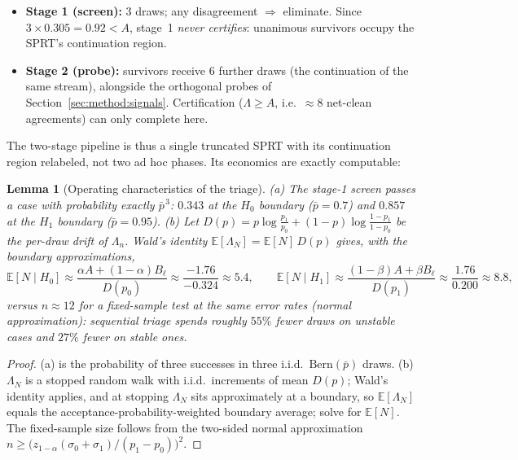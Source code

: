 \documentclass[11pt]{article}
\newtheorem{lemma}{Lemma}
\newcommand{\pbar}{\bar{p}}
\newcommand{\E}{\mathbb{E}}
\newcommand{\Bern}{\mathrm{Bern}}
\begin{document}
\begin{itemize}[leftmargin=1.6em, itemsep=1pt]
\item \textbf{Stage 1 (screen):} $3$ draws; any disagreement
  $\Rightarrow$ eliminate. Since $3 \times 0.305 = 0.92 < A$, stage~1
  \emph{never certifies}: unanimous survivors occupy the SPRT's
  continuation region.
\item \textbf{Stage 2 (probe):} survivors receive $6$ further draws (the
  continuation of the same stream), alongside the orthogonal probes of
  Section~\ref{sec:method:signals}. Certification ($\Lambda \ge A$,
  i.e.\ $\approx 8$ net-clean agreements) can only complete here.
\end{itemize}

The two-stage pipeline is thus a single truncated SPRT with its
continuation region relabeled, not two ad hoc phases. Its economics are
exactly computable:

\begin{lemma}[Operating characteristics of the triage]
\label{lem:triage}
(a) The stage-1 screen passes a case with probability exactly
$\pbar^{\,3}$: $0.343$ at the $H_0$ boundary ($\pbar = 0.7$) and
$0.857$ at the $H_1$ boundary ($\pbar = 0.95$).
(b) Let $D(p) = p \log\frac{p_1}{p_0} + (1-p)\log\frac{1-p_1}{1-p_0}$
be the per-draw drift of $\Lambda_n$. Wald's identity
$\E[\Lambda_N] = \E[N]\, D(p)$ gives, with the boundary approximations,
\begin{equation}
  \E[N \mid H_0] \approx \frac{\alpha A + (1-\alpha) B_\ell}{D(p_0)}
  \approx \frac{-1.76}{-0.324} \approx 5.4,
  \qquad
  \E[N \mid H_1] \approx \frac{(1-\beta) A + \beta B_\ell}{D(p_1)}
  \approx \frac{1.76}{0.200} \approx 8.8,
  \label{eq:waldEN}
\end{equation}
versus $n \approx 12$ for a fixed-sample test at the same error rates
(normal approximation): sequential triage spends roughly $55\%$ fewer
draws on unstable cases and $27\%$ fewer on stable ones.
\end{lemma}

\begin{proof}
(a) is the probability of three successes in three i.i.d.\
$\Bern(\pbar)$ draws. (b) $\Lambda_N$ is a stopped random walk with
i.i.d.\ increments of mean $D(p)$; Wald's identity applies, and at
stopping $\Lambda_N$ sits approximately at a boundary, so
$\E[\Lambda_N]$ equals the acceptance-probability-weighted boundary
average; solve for $\E[N]$. The fixed-sample size follows from the
two-sided normal approximation
$n \ge \big(z_{1-\alpha}(\sigma_0 + \sigma_1)/(p_1 - p_0)\big)^2$.
\end{proof}
\end{document}
